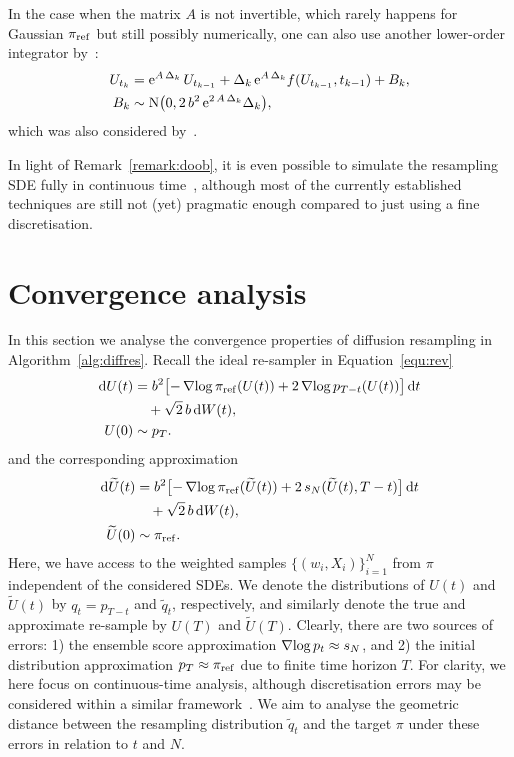 \documentclass{article}
\begin{document}
In the case when the matrix $A$ is not invertible, which rarely happens for Gaussian $\pi_{\mathrm{ref}}$ but still possibly numerically, one can also use another lower-order integrator by~\citet{Lord2004}:
%
\begin{equation*}
    \begin{split}
        U_{t_k} &= \mathrm{e}^{A \, \Delta_k} \, U_{t_{k-1}} + \Delta_k \, \mathrm{e}^{A \, \Delta_k} f(U_{t_{k-1}}, t_{k-1}) + B_k, \\
        B_k &\sim \mathrm{N}\bigl(0, 2 \, b^2 \, \mathrm{e}^{2 \, A \, \Delta_k} \Delta_k\bigr),
    \end{split}
\end{equation*}
%
which was also considered by~\citet{Zhang2023fast}.

In light of Remark~\ref{remark:doob}, it is even possible to simulate the resampling SDE fully in continuous time~\citep[see, e.g.,][]{Schauer2017, Baker2024}, although most of the currently established techniques are still not (yet) pragmatic enough compared to just using a fine discretisation. 

\section{Convergence analysis}
\label{sec:analysis}
In this section we analyse the convergence properties of diffusion resampling in Algorithm~\ref{alg:diffres}. 
Recall the ideal re-sampler in Equation~\eqref{equ:rev}
%
\begin{equation*}
    \begin{split}
        \mathop{}\!\mathrm{d} U(t) &= b^2 \bigl[-\operatorname{\nabla\!} \log \pi_{\mathrm{ref}}(U(t)) + 2\operatorname{\nabla\!}\log p_{T - t}(U(t)) \bigr]\mathop{}\!\mathrm{d} t \\
        &\quad + \sqrt{2} \, b \mathop{}\!\mathrm{d} W(t), \\
        U(0) &\sim p_T.
    \end{split}
\end{equation*}
%
and the corresponding approximation
%
\begin{align}
    \mathop{}\!\mathrm{d} \widetilde{U}(t) &= b^2 \bigl[-\operatorname{\nabla\!} \log \pi_{\mathrm{ref}}(\widetilde{U}(t)) + 2 \, s_N(\widetilde{U}(t), T - t) \bigr]\mathop{}\!\mathrm{d} t \nonumber\\
    &\quad + \sqrt{2} \, b \mathop{}\!\mathrm{d} W(t), \label{equ:diffres-rev} \\
    \widetilde{U}(0) &\sim \pi_{\mathrm{ref}}.\nonumber
\end{align}
%
Here, we have access to the weighted samples $\lbrace (w_i, X_i) \rbrace_{i=1}^N$ from $\pi$ independent of the considered SDEs. 
We denote the distributions of $U(t)$ and $\widetilde{U}(t)$ by $q_t=p_{T - t}$ and $\widetilde{q}_t$, respectively, and similarly denote the true and approximate re-sample by $U(T)$ and $\widetilde{U}(T)$.
Clearly, there are two sources of errors: 1) the ensemble score approximation $\operatorname{\nabla\!}\log p_{t} \approx s_N$, and 2) the initial distribution approximation $p_T \approx \pi_{\mathrm{ref}}$ due to finite time horizon $T$. 
For clarity, we here focus on continuous-time analysis, although discretisation errors may be considered within a similar framework~\citep[see e.g.,][]{Lord2014}. 
We aim to analyse the geometric distance between the resampling distribution $\widetilde{q}_t$ and the target $\pi$ under these errors in relation to $t$ and $N$. 
\end{document}
